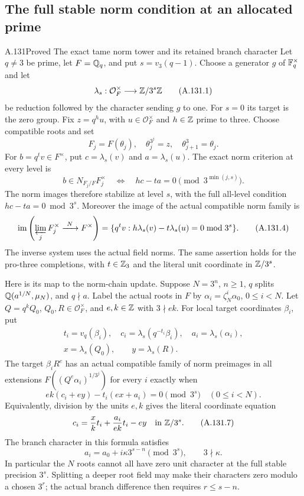 \subsection{The full stable norm condition at an allocated prime}

\begin{statement}{A.131}{Proved}
{The exact tame norm tower and its retained branch character}
Let \(q\ne3\) be prime, let \(F=\mathbb Q_q\), and put
\(s=v_3(q-1)\).  Choose a generator \(g\) of \(\mathbb F_q^\times\)
and let
\[
 \lambda_s:\mathcal O_F^\times\longrightarrow\mathbb Z/3^s\mathbb Z
 \tag{A.131.1}
\]
be reduction followed by the character sending \(g\) to one.
For \(s=0\) its target is the zero group.
Fix \(z=q^h u\), with \(u\in\mathcal O_F^\times\) and
\(h\in\mathbb Z\) prime to three.  Choose compatible roots and set
\[
                F_j=F(\theta_j),\quad
              \theta_j^{3^j}=z,\quad \theta_{j+1}^3=\theta_j.
 \tag{A.131.2}
\]
For \(b=q^t v\in F^\times\), put
\(c=\lambda_s(v)\) and \(a=\lambda_s(u)\).
The exact norm criterion at every level is
\[
 b\in N_{F_j/F}F_j^\times
       \quad\Longleftrightarrow\quad
                 hc-ta=0\pmod{3^{\min(j,s)}}.
 \tag{A.131.3}
\]
The norm images therefore stabilize at level \(s\), with
the full all-level condition \(hc-ta=0\bmod3^s\).
Moreover the image of the actual compatible norm family is
\[
 \operatorname{im}\left(\varprojlim_j F_j^\times
                      \xrightarrow{\ N\ }F^\times\right)
       =\{q^t v: h\lambda_s(v)-t\lambda_s(u)=0\bmod3^s\}.
 \tag{A.131.4}
\]
The inverse system uses the actual field norms.
The same assertion holds for the pro-three completions,
with \(t\in\mathbb Z_3\) and the literal unit coordinate in
\(\mathbb Z/3^s\).

Here is its map to the norm-chain update.
Suppose \(N=3^n\), \(n\ge1\), \(q\) splits
\(\mathbb Q(a^{1/N},\mu_N)\), and \(q\nmid a\).
Label the actual roots in \(F\) by
\(\alpha_i=\zeta_N^i\alpha_0\), \(0\le i<N\).
Let \(Q=q^kQ_0\), \(Q_0,R\in\mathcal O_F^\times\),
and \(e,k\in\mathbb Z\) with \(3\nmid ek\).
For local target coordinates \(\beta_i\), put
\[
 \begin{gathered}
 t_i=v_q(\beta_i),\quad
 c_i=\lambda_s(q^{-t_i}\beta_i),\quad
 a_i=\lambda_s(\alpha_i),\\
 x=\lambda_s(Q_0),\qquad y=\lambda_s(R).
 \end{gathered}
 \tag{A.131.5}
\]
The target \(\beta_iR^e\) has an actual compatible family
of norm preimages in all extensions
\(F((Q^e\alpha_i)^{1/3^j})\) for every \(i\) exactly when
\[
       ek(c_i+ey)-t_i(ex+a_i)=0\pmod{3^s}
                              \quad(0\le i<N).
 \tag{A.131.6}
\]
Equivalently, division by the units \(e,k\) gives the
literal coordinate equation
\[
             c_i=\frac{x}{k}t_i+\frac{a_i}{ek}t_i-ey
                                        \quad\text{in }\mathbb Z/3^s.
 \tag{A.131.7}
\]
The branch character in this formula satisfies
\[
       a_i=a_0+i\kappa3^{s-n}\pmod{3^s},
                   \qquad 3\nmid\kappa.
 \tag{A.131.8}
\]
In particular the \(N\) roots cannot all have zero unit
character at the full stable precision \(3^s\).
Splitting a deeper root field may make their characters
zero modulo a chosen \(3^r\); the actual branch difference
then requires \(r\le s-n\).


\end{statement}
